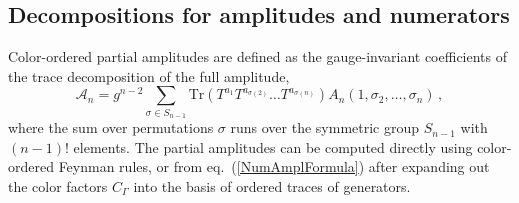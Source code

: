 \documentclass[11pt,a4paper]{article}
\def\eqn#1{eq.~(\ref{#1})}
\begin{document}
\subsection{Decompositions for amplitudes and numerators}

Color-ordered partial amplitudes are defined as the gauge-invariant coefficients of the trace decomposition of the full amplitude,
\begin{equation}
    \mathcal{A}_n = g^{n-2}\sum_{\sigma\in S_{n-1}} \textrm{Tr}(T^{a_1}T^{a_{\sigma(2)}}\ldots T^{a_{\sigma(n)}})A_n(1,\sigma_{2},\ldots,\sigma_n) \, ,
\end{equation}
where the sum over permutations $\sigma$ runs over the symmetric group $S_{n-1}$ with $(n-1)!$ elements.
The partial amplitudes can be computed directly using color-ordered Feynman rules, or from \eqn{NumAmplFormula} after expanding out the color factors $C_\Gamma$ into the basis of ordered traces of generators. 
\end{document}
